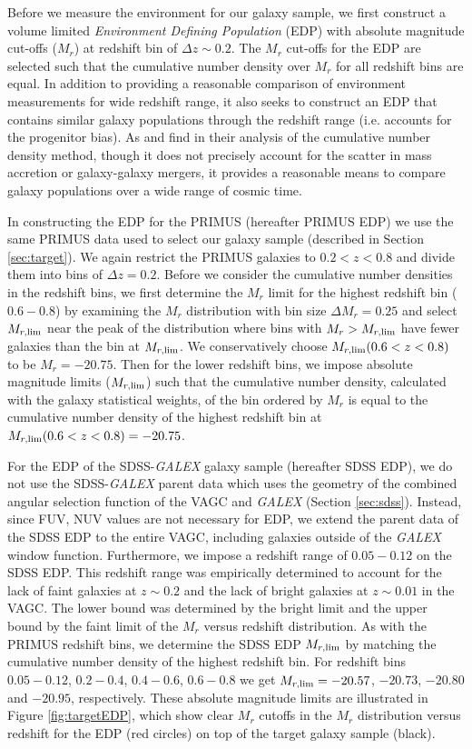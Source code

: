 \documentclass{emulateapj}
\begin{document}
Before we measure the environment for our galaxy sample, we first construct a volume limited {\em Environment Defining Population} (EDP) with absolute magnitude cut-offs ($M_{r}$) at redshift bin of $\Delta z \sim 0.2$. The $M_{r}$ cut-offs for the EDP are selected such that the cumulative number density over $M_{r}$ for all redshift bins are equal. In addition to providing a reasonable comparison of environment measurements for wide redshift range, it also seeks to construct an EDP that contains similar galaxy populations through the redshift range (i.e. accounts for the progenitor bias). As \cite{Behroozi:2013aa} and \cite{Leja:2013aa} find in their analysis of the cumulative number density method, though it does not precisely account for the scatter in mass accretion or galaxy-galaxy mergers, it provides a reasonable means to compare galaxy populations over a wide range of cosmic time. 

In constructing the EDP for the PRIMUS (hereafter PRIMUS EDP) we use the same PRIMUS data used to select our galaxy sample (described in Section \ref{sec:target}). We again restrict the PRIMUS galaxies to $0.2 < z < 0.8$ and divide them into bins of $\Delta z = 0.2$. Before we consider the cumulative number densities in the redshift bins, we first determine the $M_r$ limit for the highest redshift bin ($0.6-0.8$) by examining the $M_{r}$ distribution with bin size $\Delta M_{r} = 0.25$ and select $M_{r,\rm{lim}}$ near the peak of the distribution where bins with $M_{r} > M_{r,\rm{lim}}$ have fewer galaxies than the bin at $M_{r, \rm{lim}}$. We conservatively choose $M_{r, \rm{lim}}(0.6 < z < 0.8)$ to be $M_{r} = -20.75$. Then for the lower redshift bins, we impose absolute magnitude limits ($M_{r,\rm{lim}}$) such that the cumulative number density, calculated with the galaxy statistical weights, of the bin ordered by $M_{r}$ is equal to the cumulative number density of the highest redshift bin at $M_{r, \rm{lim}}(0.6 < z < 0.8) = -20.75$. 

For the EDP of the SDSS-{\em GALEX} galaxy sample (hereafter SDSS EDP), we do not use the SDSS-{\em GALEX} parent data which uses the geometry of the combined angular selection function of the VAGC and {\em GALEX} (Section \ref{sec:sdss}). Instead, since FUV, NUV values are not necessary for EDP, we extend the parent data of the SDSS EDP to the entire VAGC, including galaxies outside of the {\em GALEX} window function. Furthermore, we impose a redshift range of $0.05-0.12$ on the SDSS EDP. This redshift range was empirically determined to account for the lack of faint galaxies at $z \sim 0.2$ and the lack of bright galaxies at $z \sim 0.01$ in the VAGC. The lower bound was determined by the bright limit and the upper bound by the faint limit of the $M_r$ versus redshift distribution. As with the PRIMUS redshift bins, we determine the SDSS EDP $M_{r, \rm{lim}}$ by matching the cumulative number density of the highest redshift bin. For redshift bins $0.05-0.12$, $0.2-0.4$, $0.4-0.6$, $0.6-0.8$ we get $M_{r,\rm{lim}} = -20.57$, $-20.73$, $-20.80$ and $-20.95$, respectively. These absolute magnitude limits are illustrated in Figure \ref{fig:targetEDP}, which show clear $M_r$ cutoffs in the $M_{r}$ distribution versus redshift for the EDP (red circles) on top of the target galaxy sample (black). 
\end{document}
